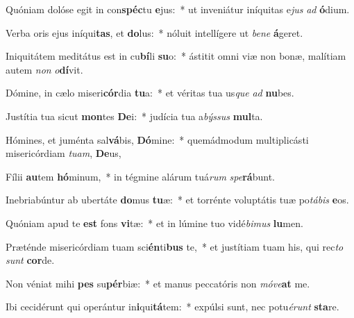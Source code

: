 \item Quóniam dolóse egit in con\textbf{spéc}tu \textbf{e}jus:~* ut inveniátur iníquitas e\textit{jus} \textit{ad} \textbf{ó}dium.
\item Verba oris ejus iníqui\textbf{tas}, et \textbf{do}lus:~* nóluit intellígere ut \textit{be}\textit{ne} \textbf{á}geret.
\item Iniquitátem meditátus est in cu\textbf{bí}li \textbf{su}o:~* ástitit omni viæ non bonæ, malítiam autem \textit{non} \textit{o}\textbf{dí}vit.
\item Dómine, in cælo miseri\textbf{cór}dia \textbf{tu}a:~* et véritas tua us\textit{que} \textit{ad} \textbf{nu}bes.
\item Justítia tua sicut \textbf{mon}tes \textbf{De}i:~* judícia tua a\textit{býs}\textit{sus} \textbf{mul}ta.
\item Hómines, et juménta sal\textbf{vá}bis, \textbf{Dó}mine:~* quemádmodum multiplicásti misericórdiam \textit{tu}\textit{am}, \textbf{De}us,
\item Fílii \textbf{au}tem \textbf{hó}minum,~* in tégmine alárum tuá\textit{rum} \textit{spe}\textbf{rá}bunt.
\item Inebriabúntur ab ubertáte \textbf{do}mus \textbf{tu}æ:~* et torrénte voluptátis tuæ po\textit{tá}\textit{bis} \textbf{e}os.
\item Quóniam apud te \textbf{est} fons \textbf{vi}tæ:~* et in lúmine tuo vidé\textit{bi}\textit{mus} \textbf{lu}men.
\item Præténde misericórdiam tuam sci\textbf{én}ti\textbf{bus} te,~* et justítiam tuam his, qui rec\textit{to} \textit{sunt} \textbf{cor}de.
\item Non véniat mihi \textbf{pes} su\textbf{pér}biæ:~* et manus peccatóris non \textit{mó}\textit{ve}\textbf{at} me.
\item Ibi cecidérunt qui operántur in\textbf{i}qui\textbf{tá}tem:~* expúlsi sunt, nec potu\textit{é}\textit{runt} \textbf{sta}re.
